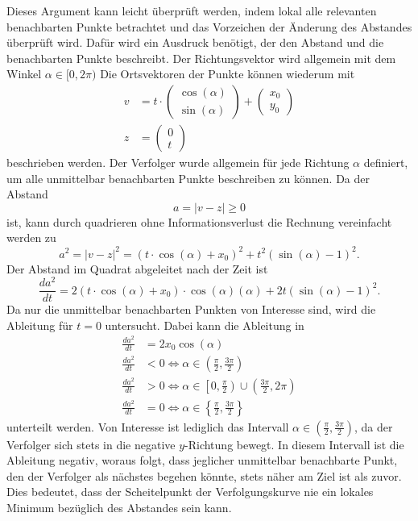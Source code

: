 Dieses Argument kann leicht überprüft werden, indem lokal alle relevanten benachbarten Punkte betrachtet und das Vorzeichen der Änderung des Abstandes überprüft wird.
Dafür wird ein Ausdruck benötigt, der den Abstand und die benachbarten Punkte beschreibt.
Der Richtungsvektor wird allgemein mit dem Winkel $\alpha \in[ 0, 2\pi)$
Die Ortsvektoren der Punkte können wiederum mit
\begin{align}
	v
	&=
	t\cdot\left(\begin{array}{c} \cos (\alpha) \\ \sin (\alpha) \end{array}\right) +\left(\begin{array}{c} x_0 \\ y_0 \end{array}\right)
	\\
	z
	&=
	\left(\begin{array}{c} 0 \\ t \end{array}\right)
\end{align}
beschrieben werden. Der Verfolger wurde allgemein für jede Richtung $\alpha$ definiert, um alle unmittelbar benachbarten Punkte beschreiben zu können.
Da der Abstand
\begin{equation}
	a
	=
	|v-z|
	\geq
	0
\end{equation}
ist, kann durch quadrieren ohne Informationsverlust die Rechnung vereinfacht werden zu
\begin{equation}
	a^2
	=
	|v-z|^2
	=
	(t\cdot\cos(\alpha)+x_0)^2+t^2(\sin(\alpha)-1)^2
	\text{.}
\end{equation}
Der Abstand im Quadrat abgeleitet nach der Zeit ist
\begin{equation}
	\frac{d a^2}{d t}
	=
	2(t\cdot\cos (\alpha)+x_0)\cdot\cos(\alpha)(\alpha)+2t(\sin(\alpha)-1)^2
	\text{.}
\end{equation}
Da nur die unmittelbar benachbarten Punkten von Interesse sind, wird die Ableitung für $t=0$ untersucht. Dabei kann die Ableitung in 
\begin{align}
	\frac{d a^2}{d t}
	&=
	2x_0\cos(\alpha)
	\\
	\frac{d a^2}{d t}
	&<
	0\Leftrightarrow\alpha\in\left( \frac{\pi}{2}, \frac{3\pi}{2}\right)
	\\
	\frac{d a^2}{d t}
	&>
	0\Leftrightarrow\alpha\in\left[0, \frac{\pi}{2}\right)\cup\left(\frac{3\pi}{2}, 2\pi\right)
	\\
	\frac{d a^2}{d t}
	&=
	0\Leftrightarrow\alpha\in\left\{ \frac{\pi}{2}, \frac{3\pi}{2}\right\}
\end{align}
unterteilt werden.
Von Interesse ist lediglich das Intervall $\alpha\in\left( \frac{\pi}{2}, \frac{3\pi}{2}\right)$, da der Verfolger sich stets in die negative $y$-Richtung bewegt.
In diesem Intervall ist die Ableitung negativ, woraus folgt, dass jeglicher unmittelbar benachbarte Punkt, den der Verfolger als nächstes begehen könnte, stets näher am Ziel ist als zuvor.
Dies bedeutet, dass der Scheitelpunkt der Verfolgungskurve nie ein lokales Minimum bezüglich des Abstandes sein kann.
%
